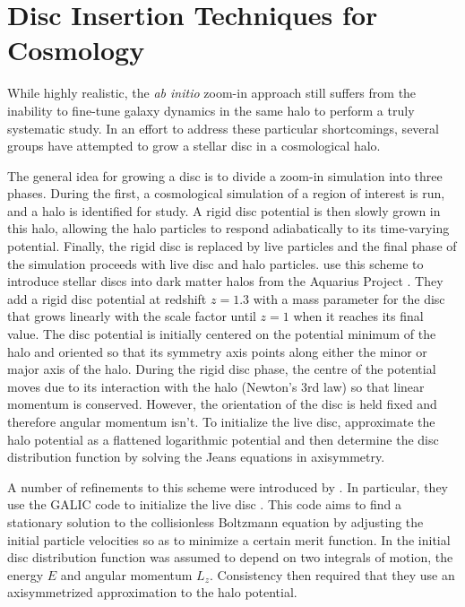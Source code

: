 \section{Disc Insertion Techniques for Cosmology}

While highly realistic, the \textit{ab initio} zoom-in approach still suffers from the inability to fine-tune galaxy dynamics in the same halo to perform a truly systematic study. In an effort to address these particular shortcomings, several groups have attempted to grow a stellar disc in a cosmological halo.  


The general idea for growing a disc is to divide a zoom-in simulation into three phases.  During the first, a cosmological simulation of a region of interest is run, and a halo is identified for study.  A rigid disc potential is then slowly grown in this halo, allowing the halo particles to respond adiabatically to its time-varying potential.  Finally, the rigid disc is replaced by live particles and the final phase of the simulation proceeds with live disc and halo particles.  \citet{debuhr_2012} use this scheme to introduce stellar discs into dark matter halos from the Aquarius Project \citep{springel2008}.  They add a rigid disc potential at redshift $z=1.3$ with a mass parameter for the disc that grows linearly with the scale factor until $z=1$ when it reaches its final value.  The disc potential is initially centered on the potential minimum of the halo and oriented so that its symmetry axis points along either the minor or major axis of the halo.  During the rigid disc phase, the centre of the potential moves due to its interaction with the halo (Newton's 3rd law) so that linear momentum is conserved.  However, the orientation of the disc is held fixed and therefore angular momentum isn't.  To initialize the live disc, \citet{debuhr_2012} approximate the halo potential as a flattened logarithmic potential and then determine the disc distribution function by solving the Jeans equations in axisymmetry. 

A number of refinements to this scheme were introduced by \citet{ys_2015}.  In particular, they use the GALIC code to initialize the live disc \citet{YurinSpringelGalic}.  This code aims to find a stationary solution to the collisionless Boltzmann equation by adjusting the initial particle velocities so as to minimize a certain merit function.  In \citet{ys_2015} the initial disc distribution function was assumed to depend on two integrals of motion, the energy $E$ and angular momentum $L_z$.  Consistency then required that they use an axisymmetrized approximation to the halo potential.

